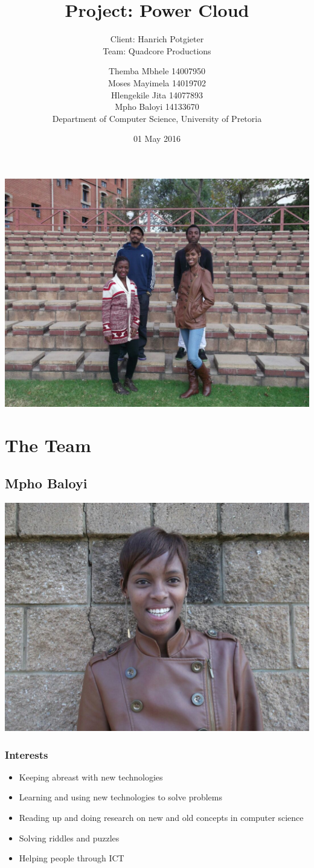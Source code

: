 \documentclass{scrartcl}
\title{Project: Power Cloud}
\subtitle{Client: Hanrich Potgieter \\ Team: Quadcore Productions\\}
\author{Themba Mbhele 14007950\\ Moses Mayimela 14019702 \\ Hlengekile Jita 14077893 \\ Mpho Baloyi 14133670 \\Department of Computer Science, University of Pretoria}
\date{01 May 2016}
\begin{document}
\maketitle
\includegraphics[width=\textwidth]{images/GroupPhoto}
\section{The Team}
\subsection{Mpho Baloyi}
\includegraphics[width=\textwidth]{images/Mpho}
\subsubsection{Interests}
\begin{itemize}
\item Keeping abreast with new technologies
\item Learning and using new technologies to solve problems
\item Reading up and doing research on new and old concepts in computer science
\item Solving riddles and puzzles
\item Helping people through ICT
\end{itemize}
\end{document}
